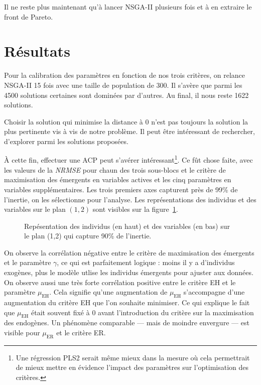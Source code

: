 \documentclass[a4paper, 11pt]{article}
\begin{document}
Il ne reste plus maintenant qu'à lancer NSGA-II plusieurs fois et à en extraire le front de Pareto.

\section{Résultats}

Pour la calibration des paramètres en fonction de nos trois critères, on relance NSGA-II 15 fois avec une taille de population de 300. Il s'avère que parmi les 4500 solutions certaines sont dominées par d'autres. Au final, il nous reste 1622 solutions.

Choisir la solution qui minimise la distance à 0 n'est pas toujours la solution la plus pertinente vis à vis de notre problème. Il peut être intéressant de rechercher, d'explorer parmi les solutions proposées. 

À cette fin, effectuer une ACP peut s'avérer intéressant\footnote{Une régression PLS2 serait même mieux dans la mesure où cela permettrait de mieux mettre en évidence l'impact des paramètres sur l'optimisation des critères.}. Ce fût chose faite, avec les valeurs de la \textit{NRMSE} pour chaun des trois sous-blocs et le critère de maximisation des émergents en variables actives et les cinq paramètres en variables supplémentaires. Les trois premiers axes capturent près de 99\% de l'inertie, on les sélectionne pour l'analyse. 
Les représentations des individus et des variables sur le plan $(1,2)$ sont visibles sur la figure~\ref{fig:pca}. 

\begin{figure}[ht]
 \centering
 
 
 \caption{Repésentation des individus (en haut) et des variables (en bas) sur le plan (1,2) qui capture 90\% de l'inertie.}
 
 \label{fig:pca}
\end{figure}

On observe la corrélation négative entre le critère de maximisation des émergents et le paramètre $\gamma$, ce qui est parfaitement logique : moins il y a d'individus exogènes, plus le modèle utlise les individus émergents pour ajuster aux données.
On observe aussi une très forte corrélation positive entre le critère EH et le paramètre $\mu_{\text{EH}}$. Cela signifie qu'une augmentation de $\mu_{\text{EH}}$ s'accompagne d'une augmentation du critère EH que l'on souhaite minimiser. Ce qui explique le fait que $\mu_{\text{EH}}$ était souvent fixé à 0 avant l'introduction du critère sur la maximisation des endogènes.
Un phénomène comparable --- mais de moindre envergure --- est visible pour $\mu_{\text{ER}}$ et le critère ER.
\end{document}
